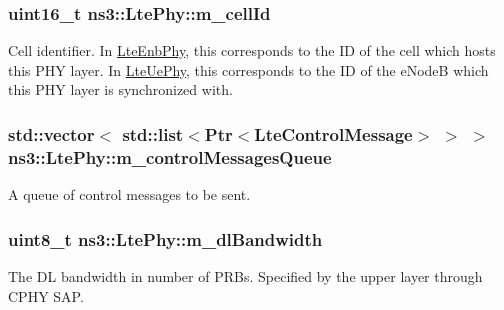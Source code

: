 \subsubsection[{\texorpdfstring{m\+\_\+cell\+Id}{m_cellId}}]{\setlength{\rightskip}{0pt plus 5cm}uint16\+\_\+t ns3\+::\+Lte\+Phy\+::m\+\_\+cell\+Id\hspace{0.3cm}{\ttfamily [protected]}}\hypertarget{classns3_1_1LtePhy_ac53d10d27f1bde64807a3ff366662787}{}\label{classns3_1_1LtePhy_ac53d10d27f1bde64807a3ff366662787}
Cell identifier. In \hyperlink{classns3_1_1LteEnbPhy}{Lte\+Enb\+Phy}, this corresponds to the ID of the cell which hosts this P\+HY layer. In \hyperlink{classns3_1_1LteUePhy}{Lte\+Ue\+Phy}, this corresponds to the ID of the e\+NodeB which this P\+HY layer is synchronized with. 
\subsubsection[{\texorpdfstring{m\+\_\+control\+Messages\+Queue}{m_controlMessagesQueue}}]{\setlength{\rightskip}{0pt plus 5cm}std\+::vector$<$ {\bf std\+::list}$<${\bf Ptr}$<${\bf Lte\+Control\+Message}$>$ $>$ $>$ ns3\+::\+Lte\+Phy\+::m\+\_\+control\+Messages\+Queue\hspace{0.3cm}{\ttfamily [protected]}}\hypertarget{classns3_1_1LtePhy_ac4794291e5ffd452495bbe1910e4f0b0}{}\label{classns3_1_1LtePhy_ac4794291e5ffd452495bbe1910e4f0b0}


A queue of control messages to be sent. 

\subsubsection[{\texorpdfstring{m\+\_\+dl\+Bandwidth}{m_dlBandwidth}}]{\setlength{\rightskip}{0pt plus 5cm}uint8\+\_\+t ns3\+::\+Lte\+Phy\+::m\+\_\+dl\+Bandwidth\hspace{0.3cm}{\ttfamily [protected]}}\hypertarget{classns3_1_1LtePhy_a566aee423c957f3b7ab7f8f7eacc7eb3}{}\label{classns3_1_1LtePhy_a566aee423c957f3b7ab7f8f7eacc7eb3}
The DL bandwidth in number of P\+R\+Bs. Specified by the upper layer through C\+P\+HY S\+AP. 
